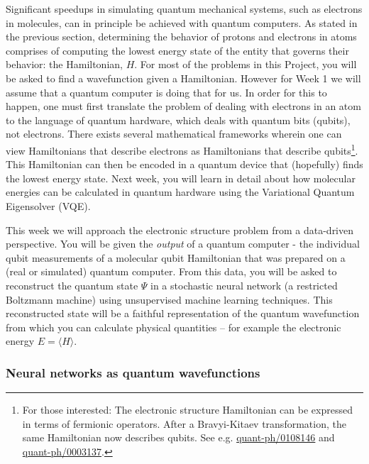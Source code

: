 \documentclass[12pt]{article}
\begin{document}
Significant speedups in simulating quantum mechanical systems, such as electrons in molecules, can in principle be achieved with quantum computers.
As stated in the previous section, determining the behavior of protons and electrons in atoms comprises of computing the lowest energy state of the entity that governs their behavior: the Hamiltonian, $H$.
For most of the problems in this Project, you will be asked to find a wavefunction given a Hamiltonian.  However for Week 1 we will assume that a quantum
computer is doing that for us.  In order for this to happen, one must first translate the problem of dealing with electrons in an atom to
the language of quantum hardware, which deals with quantum bits (qubits), not electrons.
There exists several mathematical frameworks wherein one can view Hamiltonians that describe electrons as Hamiltonians that describe qubits\footnote{For those interested: The electronic structure Hamiltonian can be expressed in terms of fermionic operators. After a Bravyi-Kitaev transformation, the same Hamiltonian now describes qubits. See e.g. \href{https://arxiv.org/abs/quant-ph/0108146}{quant-ph/0108146} and \href{https://arxiv.org/abs/quant-ph/0003137}{quant-ph/0003137}.}.
This Hamiltonian can then be encoded in a quantum device that (hopefully) finds the lowest energy state.
Next week, you will learn in detail about how molecular energies can be calculated in quantum hardware using
the Variational Quantum Eigensolver (VQE).

This week we will approach the electronic structure problem from a data-driven perspective.
You will be given the {\it output} of a quantum computer - the individual qubit measurements of a molecular qubit Hamiltonian that was prepared
on a (real or simulated) quantum computer.
From this data, you will be asked to reconstruct the quantum state $\Psi$ in a stochastic neural network
(a restricted Boltzmann machine) using unsupervised machine learning techniques.
This reconstructed state will be a faithful representation of the quantum wavefunction from which you can calculate physical quantities -- for example the electronic energy $E = \langle H \rangle$.

\subsubsection{Neural networks as quantum wavefunctions}
\end{document}
